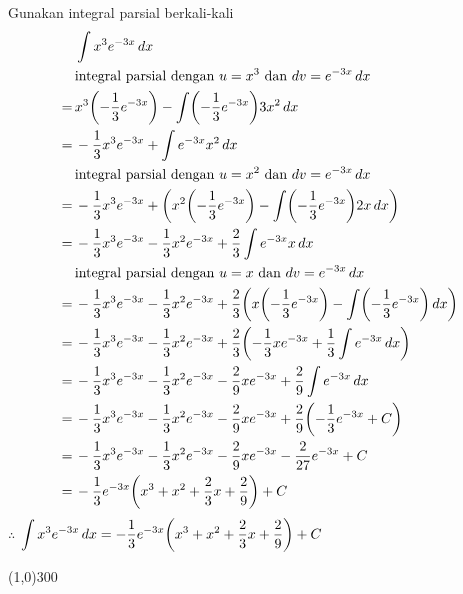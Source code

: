 \begin{enumerate}[leftmargin=*, label={\arabic*}.]
\begin{enumerate}[label={\alph*}.]
    Gunakan integral parsial berkali-kali
    \begin{align*}
        &\int x^{3}e^{-3x}\,dx\\
        &\text{integral parsial dengan $u=x^{3}$ dan $dv=e^{-3x}\,dx$}\\
        =\,&x^{3}\brk*{-\frac{1}{3}e^{-3x}}-\int\brk*{-\frac{1}{3}e^{-3x}}3x^{2}\,dx\\
        =\,&-\frac{1}{3}x^{3}e^{-3x}+\int e^{-3x}x^{2}\,dx\\
        &\text{integral parsial dengan $u=x^{2}$ dan $dv=e^{-3x}\,dx$}\\
        =\,&-\frac{1}{3}x^{3}e^{-3x}+\brk*{x^{2}\brk*{-\frac{1}{3}e^{-3x}}
        -\int \brk*{-\frac{1}{3}e^{-3x}}2x\,dx}\\
        =\,&-\frac{1}{3}x^{3}e^{-3x}-\frac{1}{3}x^{2}e^{-3x}
        +\frac{2}{3}\int e^{-3x}x\,dx\\
        &\text{integral parsial dengan $u=x$ dan $dv=e^{-3x}\,dx$}\\
        =\,&-\frac{1}{3}x^{3}e^{-3x}-\frac{1}{3}x^{2}e^{-3x}
        +\frac{2}{3}\brk*{x\brk*{-\frac{1}{3}e^{-3x}}
        -\int\brk*{-\frac{1}{3}e^{-3x}}\,dx}\\
        =\,&-\frac{1}{3}x^{3}e^{-3x}-\frac{1}{3}x^{2}e^{-3x}
        +\frac{2}{3}\brk*{-\frac{1}{3}xe^{-3x}+\frac{1}{3}\int e^{-3x}\,dx}\\
        =\,&-\frac{1}{3}x^{3}e^{-3x}-\frac{1}{3}x^{2}e^{-3x}
        -\frac{2}{9}xe^{-3x}+\frac{2}{9}\int e^{-3x}\,dx\\
        =\,&-\frac{1}{3}x^{3}e^{-3x}-\frac{1}{3}x^{2}e^{-3x}
        -\frac{2}{9}xe^{-3x}+\frac{2}{9}\brk*{-\frac{1}{3} e^{-3x}+C}\\
        =\,&-\frac{1}{3}x^{3}e^{-3x}-\frac{1}{3}x^{2}e^{-3x}
        -\frac{2}{9}xe^{-3x}-\frac{2}{27} e^{-3x}+C\\
        =\,&-\frac{1}{3}e^{-3x}\brk*{x^{3}+x^{2}
        +\frac{2}{3}x+\frac{2}{9}}+C\\
    \end{align*}
    $\therefore$ $\ds \int x^{3}e^{-3x}\,dx 
    =-\frac{1}{3}e^{-3x}\brk*{x^{3}+x^{2}+\frac{2}{3}x+\frac{2}{9}}+C$
\end{enumerate}
\end{enumerate}

\begin{center}
    \line(1,0){300}
\end{center}